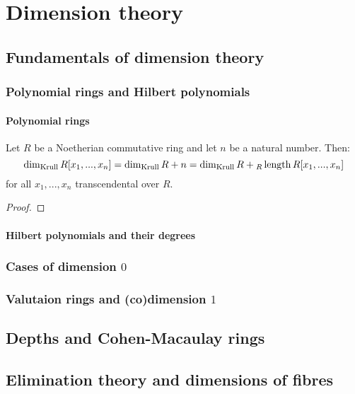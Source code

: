 \chapter{Dimension theory}
    \begin{abstract}
        
    \end{abstract}
    
    \minitoc

    \section{Fundamentals of dimension theory}
        \subsection{Polynomial rings and Hilbert polynomials}
            \subsubsection{Polynomial rings}
                \begin{proposition} \label{prop: dimensions_of_polynomial_rings}
                    Let $R$ be a Noetherian commutative ring and let $n$ be a natural number. Then:
                        $$\dim_{\mathrm{Krull}} R[x_1, ..., x_n] = \dim_{\mathrm{Krull}} R + n = \dim_{\mathrm{Krull}} R + {}_R\operatorname{length} R[x_1, ..., x_n]$$
                    for all $x_1, ..., x_n$ transcendental over $R$.
                \end{proposition}
                    \begin{proof}
                        
                    \end{proof}
                
            \subsubsection{Hilbert polynomials and their degrees}
        
        \subsection{Cases of dimension \texorpdfstring{$0$}{}}
        
        \subsection{Valutaion rings and (co)dimension \texorpdfstring{$1$}{}}
    
    \section{Depths and Cohen-Macaulay rings}
    
    \section{Elimination theory and dimensions of fibres}